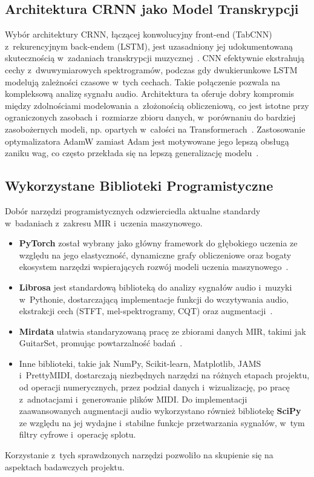 \subsection{Architektura CRNN jako Model Transkrypcji}
\label{ssec:uzasadnienie_crnn_wybor_fakt}

Wybór architektury CRNN, łączącej konwolucyjny front-end (TabCNN) z~rekurencyjnym back-endem (LSTM), jest uzasadniony jej udokumentowaną skutecznością w~zadaniach transkrypcji muzycznej~\autocite{Hawthorne2018Onsets, Wiggins2019TabCNN}. CNN efektywnie ekstrahują cechy z~dwuwymiarowych spektrogramów, podczas gdy dwukierunkowe LSTM modelują zależności czasowe w~tych cechach. Takie połączenie pozwala na kompleksową analizę sygnału audio. Architektura ta oferuje dobry kompromis między zdolnościami modelowania a~złożonością obliczeniową, co jest istotne przy ograniczonych zasobach i~rozmiarze zbioru danych, w~porównaniu do bardziej zasobożernych modeli, np. opartych w~całości na Transformerach~\autocite{Hawthorne2021Seq2SeqTranscription}. Zastosowanie optymalizatora AdamW zamiast Adam jest motywowane jego lepszą obsługą zaniku wag, co często przekłada się na lepszą generalizację modelu~\autocite{Loshchilov2019AdamW}.

\subsection{Wykorzystane Biblioteki Programistyczne}
\label{ssec:uzasadnienie_bibliotek_wybor_fakt}

Dobór narzędzi programistycznych odzwierciedla aktualne standardy w~badaniach z~zakresu MIR i~uczenia maszynowego.
\begin{itemize}
    \item \textbf{PyTorch} został wybrany jako główny framework do głębokiego uczenia ze względu na jego elastyczność, dynamiczne grafy obliczeniowe oraz bogaty ekosystem narzędzi wspierających rozwój modeli uczenia maszynowego~\autocite{Paszke2019PyTorch}.
    \item \textbf{Librosa} jest standardową biblioteką do analizy sygnałów audio i~muzyki w~Pythonie, dostarczającą implementacje funkcji do wczytywania audio, ekstrakcji cech (STFT, mel-spektrogramy, CQT) oraz augmentacji~\autocite{McFee2022Librosa}.
    \item \textbf{Mirdata} ułatwia standaryzowaną pracę ze zbiorami danych MIR, takimi jak GuitarSet, promując powtarzalność badań~\autocite{Bittner2022BasicPitch}.
    \item Inne biblioteki, takie jak NumPy, Scikit-learn, Matplotlib, JAMS i~PrettyMIDI, dostarczają niezbędnych narzędzi na różnych etapach projektu, od operacji numerycznych, przez podział danych i~wizualizację, po pracę z~adnotacjami i~generowanie plików MIDI. Do implementacji zaawansowanych augmentacji audio wykorzystano również bibliotekę \textbf{SciPy} ze względu na jej wydajne i~stabilne funkcje przetwarzania sygnałów, w~tym filtry cyfrowe i~operację splotu.
\end{itemize}
Korzystanie z~tych sprawdzonych narzędzi pozwoliło na skupienie się na aspektach badawczych projektu.

